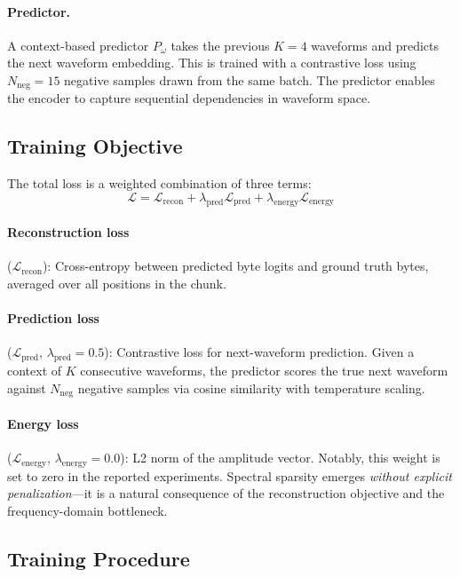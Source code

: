 \documentclass[10pt,twocolumn]{article}
\begin{document}
\paragraph{Predictor.} A context-based predictor $P_\omega$ takes the previous $K = 4$ waveforms and predicts the next waveform embedding. This is trained with a contrastive loss using $N_\text{neg} = 15$ negative samples drawn from the same batch. The predictor enables the encoder to capture sequential dependencies in waveform space.

\subsection{Training Objective}

The total loss is a weighted combination of three terms:
\begin{equation}
    \mathcal{L} = \mathcal{L}_\text{recon} + \lambda_\text{pred} \mathcal{L}_\text{pred} + \lambda_\text{energy} \mathcal{L}_\text{energy}
\end{equation}

\paragraph{Reconstruction loss} ($\mathcal{L}_\text{recon}$): Cross-entropy between predicted byte logits and ground truth bytes, averaged over all positions in the chunk.

\paragraph{Prediction loss} ($\mathcal{L}_\text{pred}$, $\lambda_\text{pred} = 0.5$): Contrastive loss for next-waveform prediction. Given a context of $K$ consecutive waveforms, the predictor scores the true next waveform against $N_\text{neg}$ negative samples via cosine similarity with temperature scaling.

\paragraph{Energy loss} ($\mathcal{L}_\text{energy}$, $\lambda_\text{energy} = 0.0$): L2 norm of the amplitude vector. Notably, this weight is set to zero in the reported experiments. Spectral sparsity emerges \emph{without explicit penalization}---it is a natural consequence of the reconstruction objective and the frequency-domain bottleneck.

\subsection{Training Procedure}
\end{document}
